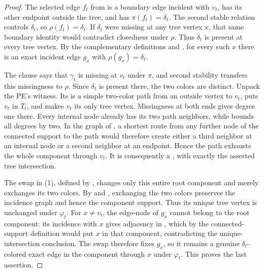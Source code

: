 \begin{proof}
The selected edge \(f_t\) from  is a
boundary edge incident with \(v_t\), has its other endpoint outside the
tree, and has \(\pi(f_t)=\delta_t\).  The second stable relation controls
\(\delta_t\), so \(\rho(f_t)=\delta_t\).  If \(\delta_t\) were missing
at any tree vertex \(x\), that same boundary identity would contradict
closedness under \(\rho\).  Thus \(\delta_t\) is present at every tree
vertex.  By the complementary definitions  and
, for every such \(x\) there is an exact incident
edge \(g_x\) with \(\rho(g_x)=\delta_t\).

The  clause says that \(\gamma_t\) is
missing at \(v_t\) under \(\pi\), and second stability transfers this
missingness to \(\rho\).  Since \(\delta_t\) is present there, the two
colors are distinct.  Unpack the PE's  witness.  Its
 is a simple two-color path from an outside vertex
to \(v_t\), puts \(v_t\) in \(T_t\), and makes \(v_t\) its only tree
vertex.  Missingness at both ends gives degree one there.  Every internal
node already has its two path neighbors, while
 bounds all degrees by two.  In the
graph of , a shortest route from any further
node of the connected support  to the path would
therefore create either a third neighbor at an internal node or a second
neighbor at an endpoint.  Hence the path exhausts the whole component
through \(v_t\).  It is consequently a
, with exactly the asserted tree
intersection.

The swap in (1), defined by , changes
only this entire root component and merely exchanges its two colors.
By  and , exchanging
the two colors preserves the incidence graph and hence the component support.
Thus its unique tree vertex is unchanged under \(\varphi_t\).  For
\(x\ne v_t\), the edge-node of \(g_x\) cannot belong to the root component:
its incidence with \(x\) gives adjacency in ,
which by the connected-support definition  would
put \(x\) in that component,
contradicting the unique-intersection conclusion.  The swap therefore
fixes \(g_x\), so it remains a genuine \(\delta_t\)-colored exact edge
in the component through \(x\) under \(\varphi_t\).  This proves the
last assertion.
\end{proof}
